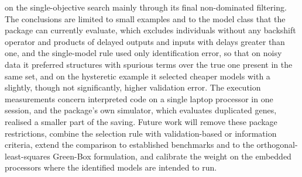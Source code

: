 on the single-objective search mainly through its final non-dominated filtering. The conclusions are limited to small
examples and to the model class that the package can currently evaluate, which excludes individuals without any
backshift operator and products of delayed outputs and inputs with delays greater than one, and the single-model rule
used only identification error, so that on noisy data it preferred structures with spurious terms over the true one
present in the same set, and on the hysteretic example it selected cheaper models with a slightly, though not
significantly, higher validation error. The execution measurements concern interpreted code on a single laptop
processor in one session, and the package's own simulator, which evaluates duplicated genes, realised a smaller part of
the saving. Future work will remove these package restrictions, combine the selection rule with validation-based or
information criteria, extend the comparison to established benchmarks and to the orthogonal-least-squares Green-Box
formulation, and calibrate the weight on the embedded processors where the identified models are intended to run.
